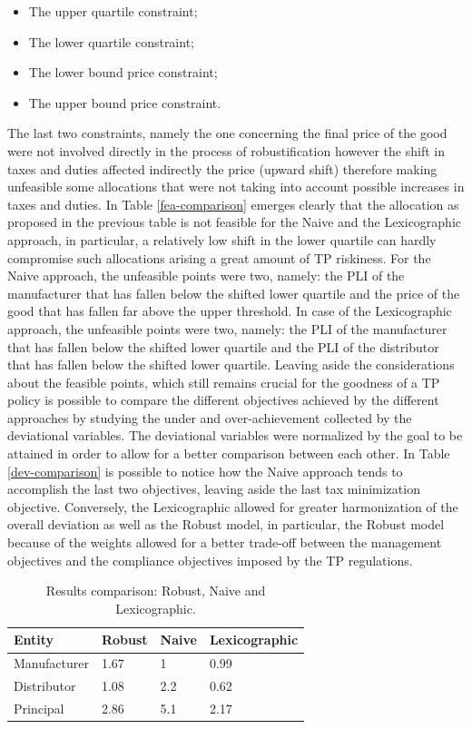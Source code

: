 \documentclass[conference,final,]{IEEEtran}
\begin{document}
\begin{itemize}
\item The upper quartile constraint;
\item The lower quartile constraint;
\item The lower bound price constraint;
\item The upper bound price constraint.
\end{itemize}
The last two constraints, namely the one concerning the final price of the good were not involved directly in the process of robustification however the shift in taxes and duties affected indirectly the price (upward shift) therefore making unfeasible some allocations that were not taking into account possible increases in taxes and duties. In Table \ref{fea-comparison} emerges clearly that the allocation as proposed in the previous table is not feasible for the Naive and the Lexicographic approach, in particular, a relatively low shift in the lower quartile can hardly compromise such allocations arising a great amount of TP riskiness. For the Naive approach, the unfeasible points were two, namely: the PLI of the manufacturer that has fallen below the shifted lower quartile and the price of the good that has fallen far above the upper threshold. In case of the Lexicographic approach, the unfeasible points were two, namely: the PLI of the manufacturer that has fallen below the shifted lower quartile and the PLI of the distributor that has fallen below the shifted lower quartile. Leaving aside the considerations about the feasible points, which still remains crucial for the goodness of a TP policy is possible to compare the different objectives achieved by the different approaches by studying the under and over-achievement collected by the deviational variables. The deviational variables were normalized by the goal to be attained in order to allow for a better comparison between each other. In Table \ref{dev-comparison} is possible to notice how the Naive approach tends to accomplish the last two objectives, leaving aside the last tax minimization objective. Conversely, the Lexicographic allowed for greater harmonization of the overall deviation as well as the Robust model, in particular, the Robust model because of the weights allowed for a better trade-off between the management objectives and the compliance objectives imposed by the TP regulations.
\begin{table}[]
\centering
\caption{Results comparison: Robust, Naive and Lexicographic.}
\label{res-comparison}
\begin{tabular}{@{}llll@{}}
\toprule
  Entity       & Robust & Naive & Lexicographic \\ \midrule
  Manufacturer & 1.67   & 1     & 0.99     \\ 
  Distributor  & 1.08   & 2.2   & 0.62     \\
  Principal    & 2.86   & 5.1   & 2.17     \\ \bottomrule
\end{tabular}
\end{table}
\end{document}
